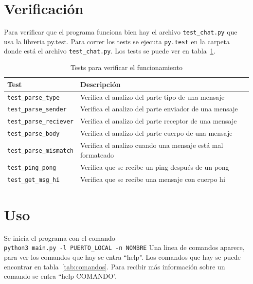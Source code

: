 \documentclass[a4paper, 12pt]{article}
\begin{document}
\newpage

\section{Verificación}
Para verificar que el programa funciona bien hay el archivo
\texttt{test\_chat.py} que usa la libreria py.test. Para correr los tests
se ejecuta \texttt{py.test} en la carpeta donde está el archivo \texttt{test\_chat.py}.
Los tests se puede ver en tabla~\ref{tab:test}.
\begin{table}[h]
        \centering
        \begin{tabular}{|p{5cm}|p{8cm}|}
                \hline
                \textbf{Test} & \textbf{Descripción} \\
                \hline
                \texttt{test\_parse\_type} & Verifica el analizo del parte tipo de una mensaje \\
                \hline
                \texttt{test\_parse\_sender} & Verifica el analizo del parte enviador de una mensaje \\
                \hline
                \texttt{test\_parse\_reciever} & Verifica el analizo del parte receptor de una mensaje \\
                \hline
                \texttt{test\_parse\_body} & Verifica el analizo del parte cuerpo de una mensaje \\
                \hline
                \texttt{test\_parse\_mismatch} & Verifica el analizo cuando una mensaje está mal formateado \\
                \hline
                \texttt{test\_ping\_pong} & Verifica que se recibe un ping después de un pong \\
                \hline
                \texttt{test\_get\_msg\_hi} & Verifica que se recibe una mensaje con cuerpo hi \\
                \hline
        \end{tabular}
        \caption{Tests para verificar el funcionamiento}
        \label{tab:test}
\end{table}

\section{Uso}
Se inicia el programa con el comando \\
\texttt{python3 main.py -l PUERTO\_LOCAL -n NOMBRE}
Una linea de comandos aparece, para ver los comandos que hay se entra ``help''.
Los comandos que hay se puede encontrar en tabla~\ref{tab:comandos}. Para
recibir más información sobre un comando se entra ``help COMANDO'.
\end{document}
